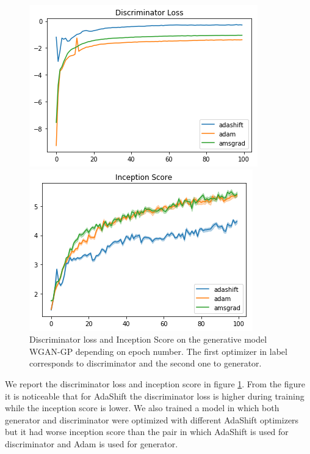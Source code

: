 \documentclass{article} %
\begin{document}
\begin{figure}[t]
\centering
\begin{minipage}{.5\linewidth}
\includegraphics[width=.99\linewidth]{wgan-discriminator-loss.png}
\end{minipage}\hfill
\begin{minipage}{.5\linewidth}
\includegraphics[width=.99\linewidth]{wgan-is.png}
\end{minipage}
\caption{Discriminator loss and Inception Score on the generative model WGAN-GP depending on epoch number. The first optimizer in label corresponds to discriminator and the second one to generator.}\label{fig:wgan}
\end{figure}

We report the discriminator loss and inception score
in figure \ref{fig:wgan}. From the figure it is noticeable
that for AdaShift the discriminator loss is higher during
training while the inception score is lower.  We also
trained a model in which both generator and discriminator
were optimized with different AdaShift optimizers but
it had worse inception score than the pair in which
AdaShift is used for discriminator and Adam is used for generator.
\end{document}

